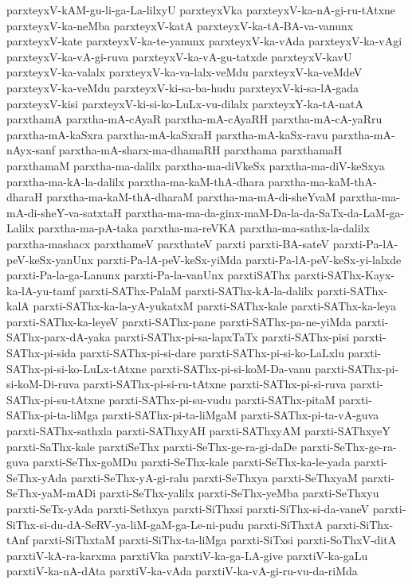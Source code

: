 {parxteyxV-kAM-gu-li-ga-La-lilxyU
parxteyxVka
parxteyxV-ka-nA-gi-ru-tAtxne
parxteyxV-ka-neMba
parxteyxV-katA
parxteyxV-ka-tA-BA-va-vanunx
parxteyxV-kate
parxteyxV-ka-te-yanunx
parxteyxV-ka-vAda
parxteyxV-ka-vAgi
parxteyxV-ka-vA-gi-ruva
parxteyxV-ka-vA-gu-tatxde
parxteyxV-kavU
parxteyxV-ka-valalx
parxteyxV-ka-va-lalx-veMdu
parxteyxV-ka-veMdeV
parxteyxV-ka-veMdu
parxteyxV-ki-sa-ba-hudu
parxteyxV-ki-sa-lA-gada
parxteyxV-kisi
parxteyxV-ki-si-ko-LuLx-vu-dilalx
parxteyxY-ka-tA-natA
parxthamA
parxtha-mA-cAyaR
parxtha-mA-cAyaRH
parxtha-mA-cA-yaRru
parxtha-mA-kaSxra
parxtha-mA-kaSxraH
parxtha-mA-kaSx-ravu
parxtha-mA-nAyx-sanf
parxtha-mA-sharx-ma-dhamaRH
parxthama
parxthamaH
parxthamaM
parxtha-ma-dalilx
parxtha-ma-diVkeSx
parxtha-ma-diV-keSxya
parxtha-ma-kA-la-dalilx
parxtha-ma-kaM-thA-dhara
parxtha-ma-kaM-thA-dharaH
parxtha-ma-kaM-thA-dharaM
parxtha-ma-mA-di-sheYvaM
parxtha-ma-mA-di-sheY-va-satxtaH
parxtha-ma-ma-da-ginx-maM-Da-la-da-SaTx-da-LaM-ga-Lalilx
parxtha-ma-pA-taka
parxtha-ma-reVKA
parxtha-ma-sathx-la-dalilx
parxtha-mashacx
parxthameV
parxthateV
parxti
parxti-BA-sateV
parxti-Pa-lA-peV-keSx-yanUnx
parxti-Pa-lA-peV-keSx-yiMda
parxti-Pa-lA-peV-keSx-yi-lalxde
parxti-Pa-la-ga-Lanunx
parxti-Pa-la-vanUnx
parxtiSAThx
parxti-SAThx-Kayx-ka-lA-yu-tamf
parxti-SAThx-PalaM
parxti-SAThx-kA-la-dalilx
parxti-SAThx-kalA
parxti-SAThx-ka-la-yA-yukatxM
parxti-SAThx-kale
parxti-SAThx-ka-leya
parxti-SAThx-ka-leyeV
parxti-SAThx-pane
parxti-SAThx-pa-ne-yiMda
parxti-SAThx-parx-dA-yaka
parxti-SAThx-pi-sa-lapxTaTx
parxti-SAThx-pisi
parxti-SAThx-pi-sida
parxti-SAThx-pi-si-dare
parxti-SAThx-pi-si-ko-LaLxlu
parxti-SAThx-pi-si-ko-LuLx-tAtxne
parxti-SAThx-pi-si-koM-Da-vanu
parxti-SAThx-pi-si-koM-Di-ruva
parxti-SAThx-pi-si-ru-tAtxne
parxti-SAThx-pi-si-ruva
parxti-SAThx-pi-su-tAtxne
parxti-SAThx-pi-su-vudu
parxti-SAThx-pitaM
parxti-SAThx-pi-ta-liMga
parxti-SAThx-pi-ta-liMgaM
parxti-SAThx-pi-ta-vA-guva
parxti-SAThx-sathxla
parxti-SAThxyAH
parxti-SAThxyAM
parxti-SAThxyeY
parxti-SaThx-kale
parxtiSeThx
parxti-SeThx-ge-ra-gi-daDe
parxti-SeThx-ge-ra-guva
parxti-SeThx-goMDu
parxti-SeThx-kale
parxti-SeThx-ka-le-yada
parxti-SeThx-yAda
parxti-SeThx-yA-gi-ralu
parxti-SeThxya
parxti-SeThxyaM
parxti-SeThx-yaM-mADi
parxti-SeThx-yalilx
parxti-SeThx-yeMba
parxti-SeThxyu
parxti-SeTx-yAda
parxti-Sethxya
parxti-SiThxsi
parxti-SiThx-si-da-vaneV
parxti-SiThx-si-du-dA-SeRV-ya-liM-gaM-ga-Le-ni-pudu
parxti-SiThxtA
parxti-SiThx-tAnf
parxti-SiThxtaM
parxti-SiThx-ta-liMga
parxti-SiTxsi
parxti-SoThxV-ditA
parxtiV-kA-ra-karxma
parxtiVka
parxtiV-ka-ga-LA-give
parxtiV-ka-gaLu
parxtiV-ka-nA-dAta
parxtiV-ka-vAda
parxtiV-ka-vA-gi-ru-vu-da-riMda
}
